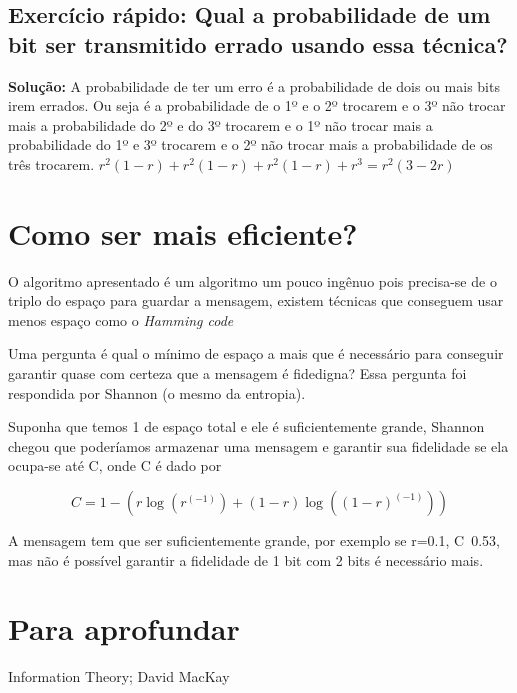 \documentclass{article}
\begin{document}
\subsection{Exercício rápido: Qual a probabilidade de um bit ser transmitido errado usando essa técnica?}
 \textbf{Solução:}
 A probabilidade de ter um erro é a probabilidade de dois ou mais bits irem errados. Ou seja
 é a probabilidade de o 1º e o 2º trocarem e o 3º não trocar mais a probabilidade do 2º e do 3º trocarem e o 1º não trocar mais a probabilidade do 1º e 3º trocarem e o 2º não trocar mais a probabilidade de os três trocarem.
 $r^2(1-r)+r^2(1-r)+r^2(1-r)+r^3=r^2(3-2r)$
 
 \section{Como ser mais eficiente?}
 
O algoritmo apresentado é um algoritmo um pouco ingênuo pois precisa-se de o triplo do espaço para guardar a mensagem, existem técnicas que conseguem usar menos espaço como o \textit{Hamming code}

Uma pergunta é qual o mínimo de espaço a mais que é necessário para conseguir garantir quase com certeza que a mensagem é fidedigna? Essa pergunta foi respondida por Shannon (o mesmo da entropia).

Suponha que temos 1 de espaço total e ele é suficientemente grande, Shannon chegou que poderíamos armazenar uma mensagem e garantir sua fidelidade se ela ocupa-se até C, onde C é dado por

\begin{equation}
    C= 1-(r \log(r^(-1))+(1-r)\log((1-r)^(-1)))
\end{equation}

A mensagem tem que ser suficientemente grande, por exemplo se r=0.1, C~0.53, mas não é possível garantir a fidelidade de 1 bit com 2 bits é necessário mais.

\section{Para aprofundar}
Information Theory; David MacKay
\end{document}
